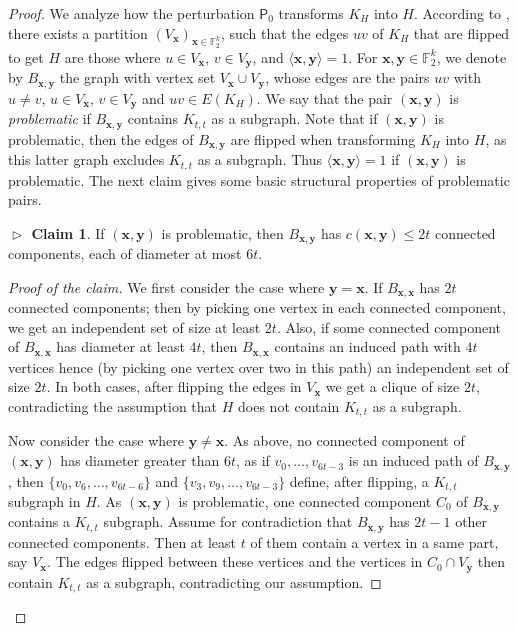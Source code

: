 \documentclass{lmcs}
\theoremstyle{definition}
\newtheorem{claim}[thm]{$\vartriangleright$ Claim} %
\newenvironment{claimproof}{\begin{proof}[Proof of the claim]
	\renewcommand\qedsymbol{$\vartriangleleft$}
}{\end{proof}}
\begin{document}
\begin{proof}
	We analyze how the perturbation $\mathsf P_0$ transforms $K_H$ into $H$.
	According to , there exists a partition $(V_{\mathbf x})_{\mathbf x\in\mathbb F_2^k}$, such that the edges $uv$ of $K_H$ that are flipped to get $H$ are those where $u\in V_{\mathbf x}$, $v\in V_{\mathbf y}$, and $\langle\mathbf{x},\mathbf{y}\rangle=1$.
	For $\mathbf x,\mathbf y\in\mathbb{F}_2^k$, we denote by $B_{\mathbf x,\mathbf y}$ the graph with vertex set $V_{\mathbf x}\cup V_{\mathbf y}$, whose edges are the pairs $uv$ with $u\neq v$, $u\in V_{\mathbf x}$, $v\in V_{\mathbf y}$ and $uv\in E(K_H)$. We say that the pair $(\mathbf x,\mathbf y)$ is \emph{problematic} if $B_{\mathbf x,\mathbf y}$ contains $K_{t,t}$ as a subgraph. Note that if $(\mathbf x,\mathbf y)$ is problematic, then the edges of $B_{\mathbf x,\mathbf y}$  are flipped when transforming $K_H$ into $H$, as this latter graph excludes $K_{t,t}$ as a subgraph. Thus $\langle\mathbf{x},\mathbf{y}\rangle=1$ if $(\mathbf x,\mathbf y)$ is problematic.
	The next claim gives some basic structural properties of problematic pairs.
	
	\begin{claim}
		\label{claim:cc}
		If $(\mathbf x,\mathbf y)$ is problematic, then 
		$B_{\mathbf x,\mathbf y}$ has $c(\mathbf x,\mathbf y)\leq 2t$ connected components, each of diameter at most $6t$.
	\end{claim}
	\begin{claimproof}
		We first consider the case where $\mathbf y=\mathbf x$.
		If $B_{\mathbf x,\mathbf x}$ has $2t$ connected components; then by picking one vertex in each connected component, we get an independent set of size at least $2t$.
		Also, if some connected component of $B_{\mathbf x,\mathbf x}$ has diameter at least $4t$, then $B_{\mathbf x,\mathbf x}$ contains an induced path with $4t$ vertices hence (by picking one vertex over two in this path) an independent set of size $2t$. In both cases, after flipping the edges in $V_{\mathbf x}$ we get a clique of size $2t$, contradicting the assumption that $H$ does not contain $K_{t,t}$ as a subgraph. 
		
		Now consider the case where $\mathbf y\neq\mathbf x$.
		As above, no connected component of $(\mathbf x,\mathbf y)$ has diameter greater than $6t$, as if $v_0,\dots,v_{6t-3}$ is an induced path
		of $B_{\mathbf x,\mathbf y}$, then $\{v_0,v_6,\dots,v_{6t-6}\}$ and 
		$\{v_3,v_9,\dots,v_{6t-3}\}$ define, after flipping, a $K_{t,t}$ subgraph in $H$.	As $(\mathbf x,\mathbf y)$ is problematic, one connected  component $C_0$ of $B_{\mathbf x,\mathbf y}$ contains a $K_{t,t}$ subgraph. Assume for contradiction that $B_{\mathbf x,\mathbf y}$  has $2t-1$ other connected components. Then at least $t$ of them contain a vertex in a same part, say $V_{\mathbf x}$. The edges flipped between these vertices and the vertices in $C_0\cap V_{\mathbf y}$ then contain $K_{t,t}$ as a subgraph, contradicting our assumption.
		\end{claimproof}
	

\end{proof}
\end{document}
